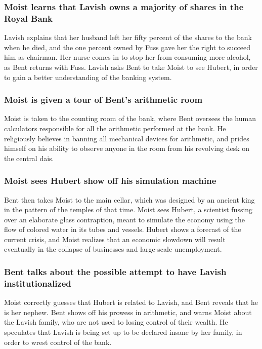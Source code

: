 \subsubsection{\Gls{Moist} learns that \Gls{Lavish} owns a majority of shares in the Royal Bank}
\Gls{Lavish} explains that her husband left her fifty percent of the shares to the bank when he
died, and the one percent owned by \Gls{Fuss} gave her the right to succeed him as chairman. Her
nurse comes in to stop her from consuming more alcohol, as \Gls{Bent} returns with \Gls{Fuss}.
\Gls{Lavish} asks \Gls{Bent} to take \Gls{Moist} to see \Gls{Hubert}, in order to gain a better
understanding of the banking system.

\subsubsection{\Gls{Moist} is given a tour of \Gls{Bent}'s arithmetic room}
\Gls{Moist} is taken to the counting room of the bank, where \Gls{Bent} oversees the human
calculators responsible for all the arithmetic performed at the bank. He religiously believes in
banning all mechanical devices for arithmetic, and prides himself on his ability to observe anyone
in the room from his revolving desk on the central dais.

\subsubsection{\Gls{Moist} sees \Gls{Hubert} show off his simulation machine}
\Gls{Bent} then takes \Gls{Moist} to the main cellar, which was designed by an ancient king in the
pattern of the temples of that time. \Gls{Moist} sees \Gls{Hubert}, a scientist fussing over an
elaborate glass contraption, meant to simulate the economy using the flow of colored water in its
tubes and vessels. \Gls{Hubert} shows a forecast of the current crisis, and \Gls{Moist} realizes
that an economic slowdown will result eventually in the collapse of businesses and large-scale
unemployment.

\subsubsection{\Gls{Bent} talks about the possible attempt to have \Gls{Lavish} institutionalized}
\Gls{Moist} correctly guesses that \Gls{Hubert} is related to \Gls{Lavish}, and \Gls{Bent} reveals
that he is her nephew. \Gls{Bent} shows off his prowess in arithmetic, and warns \Gls{Moist} about
the Lavish family, who are not used to losing control of their wealth. He speculates that
\Gls{Lavish} is being set up to be declared insane by her family, in order to wrest control of the
bank.

